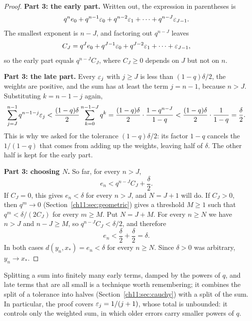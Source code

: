 \begin{proof}
\textbf{Part 3: the early part.} Written out, the expression in parentheses is
\[
 q^ne_0+q^{n-1}\varepsilon_0+q^{n-2}\varepsilon_1+\cdots+q^{n-J}\varepsilon_{J-1}.
\]
The smallest exponent is $n-J$, and factoring out $q^{n-J}$ leaves
\[
 C_J=q^Je_0+q^{J-1}\varepsilon_0+q^{J-2}\varepsilon_1+\cdots+\varepsilon_{J-1},
\]
so the early part equals $q^{n-J}C_J$, where $C_J\ge0$ depends on $J$ but not on $n$.

\textbf{Part 3: the late part.} Every $\varepsilon_j$ with $j\ge J$ is less than $(1-q)\delta/2$, the weights are positive, and the sum has at least the term $j=n-1$, because $n>J$. Substituting $k=n-1-j$ again,
\[
 \sum_{j=J}^{n-1}q^{n-1-j}\varepsilon_j
 <\frac{(1-q)\delta}{2}\sum_{k=0}^{n-1-J}q^k
 =\frac{(1-q)\delta}{2}\cdot\frac{1-q^{n-J}}{1-q}
 <\frac{(1-q)\delta}{2}\cdot\frac1{1-q}=\frac\delta2.
\]
This is why we asked for the tolerance $(1-q)\delta/2$: its factor $1-q$ cancels the $1/(1-q)$ that comes from adding up the weights, leaving half of $\delta$. The other half is kept for the early part.

\textbf{Part 3: choosing $N$.} So far, for every $n>J$,
\[
 e_n<q^{n-J}C_J+\frac\delta2.
\]
If $C_J=0$, this gives $e_n<\delta$ for every $n>J$, and $N=J+1$ will do. If $C_J>0$, then $q^m\to0$ (Section~\ref{ch11:sec:geometric}) gives a threshold $M\ge1$ such that $q^m<\delta/(2C_J)$ for every $m\ge M$. Put $N=J+M$. For every $n\ge N$ we have $n>J$ and $n-J\ge M$, so $q^{n-J}C_J<\delta/2$, and therefore
\[
 e_n<\frac\delta2+\frac\delta2=\delta.
\]
In both cases $d(y_n,x_*)=e_n<\delta$ for every $n\ge N$. Since $\delta>0$ was arbitrary, $y_n\to x_*$.
\end{proof}

Splitting a sum into finitely many early terms, damped by the powers of $q$, and late terms that are all small is a technique worth remembering; it combines the split of a tolerance into halves (Section~\ref{ch11:sec:cauchy}) with a split of the sum. In particular, the proof covers $\varepsilon_j=1/(j+1)$, whose total is unbounded: it controls only the weighted sum, in which older errors carry smaller powers of $q$.


